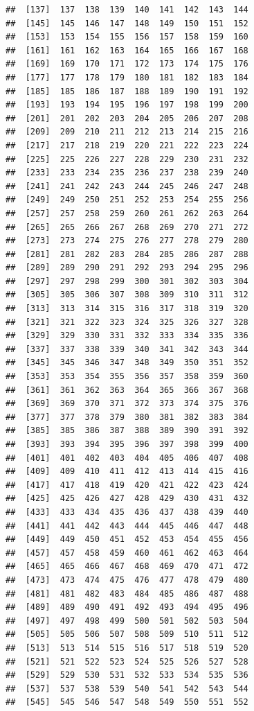 \documentclass[
]{book}
\begin{document}
\begin{verbatim}
##  [137]  137  138  139  140  141  142  143  144
##  [145]  145  146  147  148  149  150  151  152
##  [153]  153  154  155  156  157  158  159  160
##  [161]  161  162  163  164  165  166  167  168
##  [169]  169  170  171  172  173  174  175  176
##  [177]  177  178  179  180  181  182  183  184
##  [185]  185  186  187  188  189  190  191  192
##  [193]  193  194  195  196  197  198  199  200
##  [201]  201  202  203  204  205  206  207  208
##  [209]  209  210  211  212  213  214  215  216
##  [217]  217  218  219  220  221  222  223  224
##  [225]  225  226  227  228  229  230  231  232
##  [233]  233  234  235  236  237  238  239  240
##  [241]  241  242  243  244  245  246  247  248
##  [249]  249  250  251  252  253  254  255  256
##  [257]  257  258  259  260  261  262  263  264
##  [265]  265  266  267  268  269  270  271  272
##  [273]  273  274  275  276  277  278  279  280
##  [281]  281  282  283  284  285  286  287  288
##  [289]  289  290  291  292  293  294  295  296
##  [297]  297  298  299  300  301  302  303  304
##  [305]  305  306  307  308  309  310  311  312
##  [313]  313  314  315  316  317  318  319  320
##  [321]  321  322  323  324  325  326  327  328
##  [329]  329  330  331  332  333  334  335  336
##  [337]  337  338  339  340  341  342  343  344
##  [345]  345  346  347  348  349  350  351  352
##  [353]  353  354  355  356  357  358  359  360
##  [361]  361  362  363  364  365  366  367  368
##  [369]  369  370  371  372  373  374  375  376
##  [377]  377  378  379  380  381  382  383  384
##  [385]  385  386  387  388  389  390  391  392
##  [393]  393  394  395  396  397  398  399  400
##  [401]  401  402  403  404  405  406  407  408
##  [409]  409  410  411  412  413  414  415  416
##  [417]  417  418  419  420  421  422  423  424
##  [425]  425  426  427  428  429  430  431  432
##  [433]  433  434  435  436  437  438  439  440
##  [441]  441  442  443  444  445  446  447  448
##  [449]  449  450  451  452  453  454  455  456
##  [457]  457  458  459  460  461  462  463  464
##  [465]  465  466  467  468  469  470  471  472
##  [473]  473  474  475  476  477  478  479  480
##  [481]  481  482  483  484  485  486  487  488
##  [489]  489  490  491  492  493  494  495  496
##  [497]  497  498  499  500  501  502  503  504
##  [505]  505  506  507  508  509  510  511  512
##  [513]  513  514  515  516  517  518  519  520
##  [521]  521  522  523  524  525  526  527  528
##  [529]  529  530  531  532  533  534  535  536
##  [537]  537  538  539  540  541  542  543  544
##  [545]  545  546  547  548  549  550  551  552

\end{verbatim}
\end{document}
